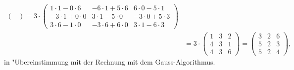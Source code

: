 \begin{align*}
{\begin{pmatrix}
\end{pmatrix}
}
=
3\cdot
\begin{pmatrix}
 1\cdot 1-0\cdot 6&-6\cdot 1+5\cdot 6& 6\cdot 0-5\cdot 1\\
-3\cdot 1+0\cdot 0& 3\cdot 1-5\cdot 0&-3\cdot 0+5\cdot 3\\
 3\cdot 6-1\cdot 0&-3\cdot 6+6\cdot 0& 3\cdot 1-6\cdot 3
\end{pmatrix}
\\
&=
3\cdot
\begin{pmatrix}
1&3&2\\
4&3&1\\
4&3&6
\end{pmatrix}
=
\begin{pmatrix}
3&2&6\\
5&2&3\\
5&2&4
\end{pmatrix},
\end{align*}
in "Ubereinstimmung mit der Rechnung mit dem Gauss-Algorithmus.

